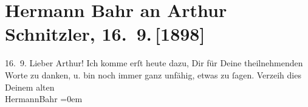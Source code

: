 

         \renewcommand{\erwaehnteOrte}{Orte: Wien}
         \renewcommand{\erwaehnteWerke}{}
               \section[Hermann Bahr an Arthur Schnitzler, 16. 9. {[}1898{]}]{ Hermann Bahr an Arthur Schnitzler, 16. 9. {[}1898{]}}\nopagebreak{}\rehead{ }\begin{ledgroupsized}[t]{13cm}\normalsize\beginnumbering \toendnotes[C]{\smallbreak\pagebreak[2]} 
\pstart
           \raggedleft{}{\pb}16. 9.\pend
           \pstart\center{}Lieber Arthur!\pend\pstart
           Ich komme erſt heute dazu, Dir für Deine theilnehmenden Worte zu danken, u. bin noch
               immer ganz unfähig, etwas zu ſagen. Verzeih dies\pend
           \pstart
           Deinem alten{\\[\baselineskip]}\spacefill\mbox{HermannBahr}\pend
           \leftskip=0em{}
         
         \endnumbering{}\end{ledgroupsized}  \newcommand{\dateiname}{L00846}\newcommand{\titel}{Hermann Bahr an Arthur Schnitzler, 16. 9. [1898]}\newcommand{\editorInnen}{ Kurt Ifkovits,  Martin Anton Müller}
      